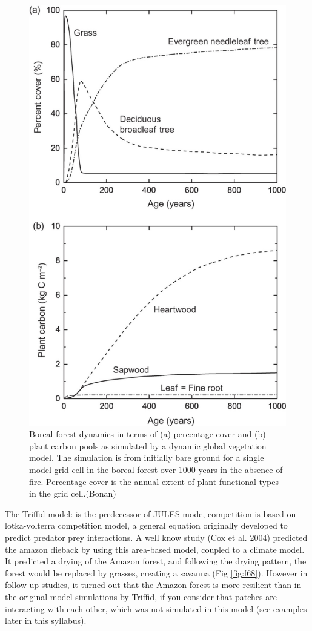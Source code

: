 \documentclass[12pt,oneside]{book}
\begin{document}
\begin{figure}

{\centering \includegraphics[width=0.8\linewidth]{figures/chap6/f67_DGM_boreal_succession} 

}

\caption{Boreal forest dynamics in terms of (a) percentage cover and (b) plant carbon pools as simulated by a dynamic global vegetation model. The simulation is from initially bare ground for a single model grid cell in the boreal forest over 1000 years in the absence of fire. Percentage cover is the annual extent of plant functional types in the grid cell.(Bonan)}\label{fig:f67}
\end{figure}

The Triffid model: is the predecessor of JULES mode, competition is
based on lotka-volterra competition model, a general equation originally
developed to predict predator prey interactions. A well know study (Cox
et al. 2004) predicted the amazon dieback by using this area-based
model, coupled to a climate model. It predicted a drying of the Amazon
forest, and following the drying pattern, the forest would be replaced
by grasses, creating a savanna (Fig \ref{fig:f68}). However in follow-up
studies, it turned out that the Amazon forest is more resilient than in
the original model simulations by Triffid, if you consider that patches
are interacting with each other, which was not simulated in this model
(see examples later in this syllabus).
\end{document}

